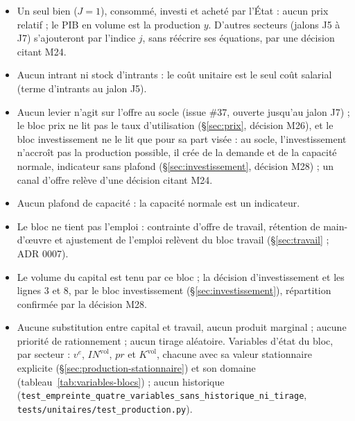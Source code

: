 \documentclass[11pt,a4paper]{article}
\begin{document}
\begin{portee}
\begin{itemize}
\item Un seul bien ($J = 1$), consommé, investi et acheté par l'État : aucun prix relatif ; le PIB en volume est la production $y$. D'autres secteurs (jalons J5 à J7) s'ajouteront par l'indice $j$, sans réécrire ses équations, par une décision citant M24.
\item Aucun intrant ni stock d'intrants : le coût unitaire est le seul coût salarial (terme d'intrants au jalon J5).
\item Aucun levier n'agit sur l'offre au socle (issue \#37, ouverte jusqu'au jalon J7) ; le bloc prix ne lit pas le taux d'utilisation (\S\ref{sec:prix}, décision M26), et le bloc investissement ne le lit que pour sa part visée : au socle, l'investissement n'accroît pas la production possible, il crée de la demande et de la capacité normale, indicateur sans plafond (\S\ref{sec:investissement}, décision M28) ; un canal d'offre relève d'une décision citant M24.
\item Aucun plafond de capacité : la capacité normale est un indicateur.
\item Le bloc ne tient pas l'emploi : contrainte d'offre de travail, rétention de main-d'œuvre et ajustement de l'emploi relèvent du bloc travail (\S\ref{sec:travail} ; ADR 0007).
\item Le volume du capital est tenu par ce bloc ; la décision d'investissement et les lignes 3 et 8, par le bloc investissement (\S\ref{sec:investissement}), répartition confirmée par la décision M28.
\item Aucune substitution entre capital et travail, aucun produit marginal ; aucune priorité de rationnement ; aucun tirage aléatoire. Variables d'état du bloc, par secteur : $v^e$, $\mathit{IN}^{\mathrm{vol}}$, $\mathit{pr}$ et $K^{\mathrm{vol}}$, chacune avec sa valeur stationnaire explicite (\S\ref{sec:production-stationnaire}) et son domaine (tableau~\ref{tab:variables-blocs}) ; aucun historique (\nolinkurl{test_empreinte_quatre_variables_sans_historique_ni_tirage}, \nolinkurl{tests/unitaires/test_production.py}).
\end{itemize}
\end{portee}

\end{document}
